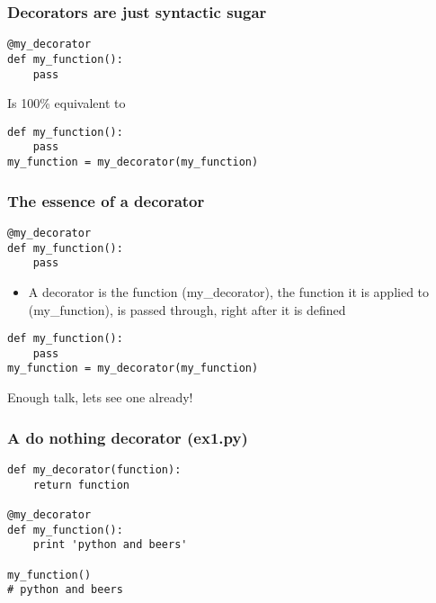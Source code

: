 \documentclass{beamer}
\begin{document}
\begin{frame}[fragile]
  \frametitle{Decorators are just syntactic sugar}
\begin{verbatim}
@my_decorator
def my_function():
    pass
\end{verbatim}
\begin{alertblock}{\vspace*{-3ex}}
  Is 100\% equivalent to
\end{alertblock}
\begin{verbatim}
def my_function():
    pass
my_function = my_decorator(my_function)
\end{verbatim}
\end{frame}

\begin{frame}[fragile]
  \frametitle{The essence of a decorator}
\begin{verbatim}
@my_decorator
def my_function():
    pass
\end{verbatim}
\begin{block}{\vspace*{-3ex}}
\begin{itemize}
\item A decorator is the function (my\_decorator), the function it is applied to (my\_function), is passed through, right after it is defined
\end{itemize}
\end{block}
\begin{verbatim}
def my_function():
    pass
my_function = my_decorator(my_function)
\end{verbatim}
\begin{block}{\vspace*{-3ex}}
  Enough talk, lets see one already!
\end{block}
\end{frame}

\begin{frame}[fragile]
  \frametitle{A do nothing decorator (ex1.py)}
\begin{verbatim}
def my_decorator(function):
    return function

@my_decorator
def my_function():
    print 'python and beers'

my_function()
# python and beers
\end{verbatim}
\end{frame}
\end{document}

